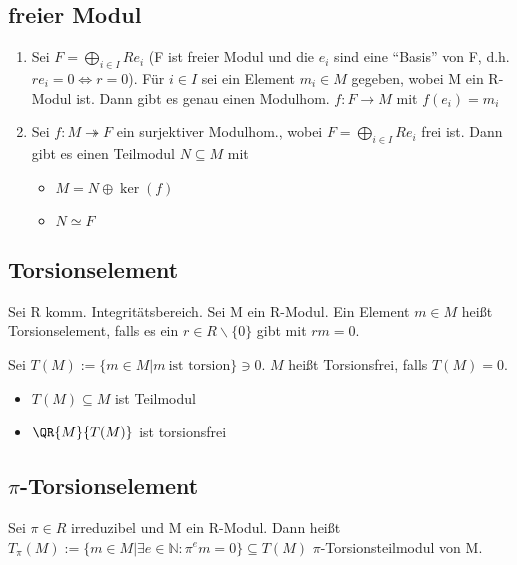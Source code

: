 \subsection{freier Modul}
\begin{enumerate}
	\item Sei $F = \bigoplus \limits_{i \in I} R e_i $ (F ist freier Modul und die $e_i$ sind eine \enquote{Basis} von F, d.h. $r e_i = 0 \Leftrightarrow r=0$).
	Für $i\in I$ sei ein Element $m_i \in M$ gegeben, wobei M ein R-Modul ist.
	Dann gibt es genau einen Modulhom. $f:F \rightarrow M $ mit $f(e_i) = m_i$
	\item Sei $f:M \twoheadrightarrow F$ ein surjektiver Modulhom., wobei $F = \bigoplus \limits_{i \in I}R e_i$ frei ist. Dann gibt es einen Teilmodul $N \subseteq M$ mit
	\begin{itemize}
		\item $M = N \oplus \ker(f)$
		\item $N \simeq F$
	\end{itemize}
\end{enumerate}
\subsection{Torsionselement}
\begin{definition}
Sei R komm. Integritätsbereich. Sei M ein R-Modul. Ein Element $m\in M$ heißt Torsionselement, falls es ein $r\in R \backslash \{0\}$ gibt mit $rm=0$.

Sei $T(M) := \{m \in M | m~\text{ist torsion} \} \ni 0$. $M$ heißt Torsionsfrei, falls $T(M) = 0$.
\end{definition}

\begin{remark}
\begin{itemize}
	\item $T(M) \subseteq M$ ist Teilmodul
	\item $\QR{M}{T(M)}$ ist torsionsfrei
\end{itemize}
\end{remark}

\subsection{$\pi$-Torsionselement}
\begin{definition}
Sei $\pi \in R$ irreduzibel und M ein R-Modul. Dann heißt $T_\pi (M):= \{m \in M | \exists e \in \mathbb{N}: \pi^em = 0 \} \subseteq T(M)$ $\pi$-Torsionsteilmodul von M.
\end{definition}

